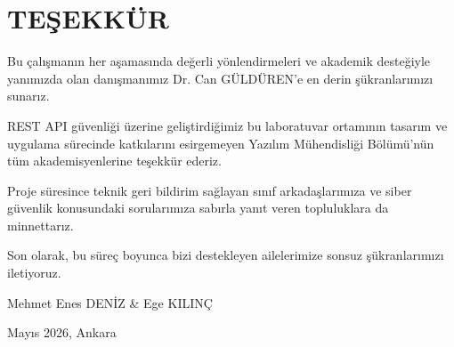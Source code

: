 \clearpage
\section*{TEŞEKKÜR}
\label{tesekkur}

Bu çalışmanın her aşamasında değerli yönlendirmeleri ve akademik desteğiyle yanımızda olan danışmanımız Dr. Can GÜLDÜREN'e en derin şükranlarımızı sunarız.

REST API güvenliği üzerine geliştirdiğimiz bu laboratuvar ortamının tasarım ve uygulama sürecinde katkılarını esirgemeyen Yazılım Mühendisliği Bölümü'nün tüm akademisyenlerine teşekkür ederiz.

Proje süresince teknik geri bildirim sağlayan sınıf arkadaşlarımıza ve siber güvenlik konusundaki sorularımıza sabırla yanıt veren topluluklara da minnettarız.

Son olarak, bu süreç boyunca bizi destekleyen ailelerimize sonsuz şükranlarımızı iletiyoruz.

\vspace{2cm}

\hfill Mehmet Enes DENİZ \& Ege KILINÇ

\hfill Mayıs 2026, Ankara

\clearpage
